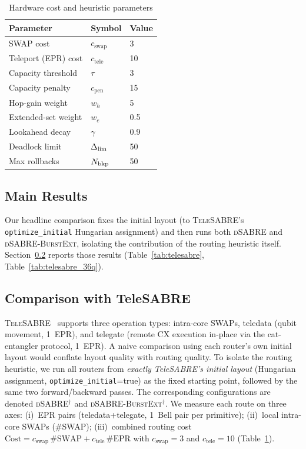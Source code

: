 \documentclass[conference]{IEEEtran}
\newcommand{\dSABRE}{\textsc{dSABRE}}
\newcommand{\BurstExt}{\textsc{dSABRE-BurstExt}}
\newcommand{\TeleSABRE}{\textsc{TeleSABRE}}
\begin{document}
\begin{table}[t]
\centering
\caption{Hardware cost and heuristic parameters}
\label{tab:params}
\begin{tabular}{@{}lll@{}}
\toprule
Parameter & Symbol & Value \\
\midrule
SWAP cost             & $c_{\mathrm{swap}}$ & 3 \\
Teleport (EPR) cost   & $c_{\mathrm{tele}}$ & 10 \\
Capacity threshold    & $\tau$              & 3 \\
Capacity penalty      & $c_{\mathrm{pen}}$  & 15 \\
Hop-gain weight       & $w_h$               & 5 \\
Extended-set weight   & $w_e$               & 0.5 \\
Lookahead decay       & $\gamma$            & 0.9 \\
Deadlock limit        & $\Delta_{\rm lim}$  & 50 \\
Max rollbacks         & $N_{\rm bkp}$       & 50 \\
\bottomrule
\end{tabular}
\end{table}

\subsection{Main Results}

Our headline comparison fixes the initial layout (to \TeleSABRE{}'s
\texttt{optimize\_initial} Hungarian assignment) and then runs both
\dSABRE{} and \BurstExt{}, isolating the contribution of the routing
heuristic itself.
Section~\ref{sec:telesabre_comp} reports those results
(Table~\ref{tab:telesabre}, Table~\ref{tab:telesabre_36q}).

\subsection{Comparison with TeleSABRE}
\label{sec:telesabre_comp}

\TeleSABRE{}~\cite{russo2025telesabre} supports three operation types:
intra-core SWAPs, teledata (qubit movement, 1~EPR), and telegate
(remote CX execution in-place via the cat-entangler protocol, 1~EPR).
A naive comparison using each router's own initial layout would conflate
layout quality with routing quality.
To isolate the routing heuristic, we run all routers from
\emph{exactly TeleSABRE's initial layout} (Hungarian assignment,
\texttt{optimize\_initial}=true) as the fixed starting point, followed by
the same two forward/backward passes.
The corresponding configurations are denoted \dSABRE$^{\dagger}$ and
\BurstExt$^{\dagger}$.
We measure each route on three axes:
(i)~EPR pairs (teledata+telegate, 1~Bell pair per primitive);
(ii)~local intra-core SWAPs (\#SWAP);
(iii)~combined routing cost
$\mathrm{Cost}=c_{\mathrm{swap}}\,\#\mathrm{SWAP}+c_{\mathrm{tele}}\,\#\mathrm{EPR}$
with $c_{\mathrm{swap}}=3$ and $c_{\mathrm{tele}}=10$
(Table~\ref{tab:params}).
\end{document}
